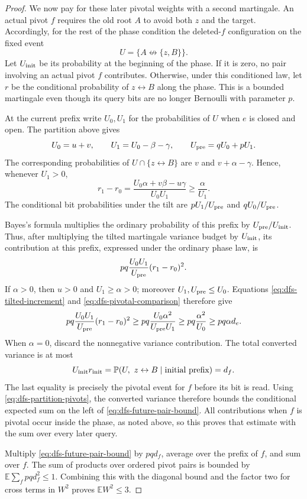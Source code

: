 \documentclass[11pt]{article}
\theoremstyle{definition}
\newcommand{\PP}{\mathbb P}
\newcommand{\EE}{\mathbb E}
\begin{document}
\begin{proof}
We now pay for these later pivotal weights with a second martingale.
An actual pivot $f$ requires the old root $A$ to avoid both $z$ and the
target. Accordingly, for the rest of the phase condition the deleted-$f$
configuration on the fixed event
\[
 U=\{A\not\leftrightarrow\{z,B\}\}.
\]
Let $U_{\rm init}$ be its probability at the beginning of the phase.
If it is zero, no pair involving an actual pivot $f$ contributes.
Otherwise, under this conditioned law, let $r$ be the conditional
probability of $z\leftrightarrow B$ along the phase. This is a
bounded martingale even though its query bits are no longer Bernoulli
with parameter $p$.

At the current prefix write $U_0,U_1$ for the probabilities of $U$
when $e$ is closed and open. The partition above gives
\[
 U_0=u+v,\qquad U_1=U_0-\beta-\gamma,
 \qquad U_{\rm pre}=qU_0+pU_1.
\]
The corresponding probabilities of $U\cap\{z\leftrightarrow B\}$
are $v$ and $v+\alpha-\gamma$. Hence, whenever $U_1>0$,
\begin{equation}\label{eq:dfs-tilted-increment}
 r_1-r_0
 =\frac{U_0\alpha+v\beta-u\gamma}{U_0U_1}
 \ge\frac\alpha{U_1}.
\end{equation}
The conditional bit probabilities under the tilt are
$pU_1/U_{\rm pre}$ and $qU_0/U_{\rm pre}$.

Bayes's formula multiplies the ordinary probability of this prefix by
$U_{\rm pre}/U_{\rm init}$. Thus, after multiplying the tilted
martingale variance budget by $U_{\rm init}$, its contribution at
this prefix, expressed under the ordinary phase law, is
\[
 pq\frac{U_0U_1}{U_{\rm pre}}(r_1-r_0)^2.
\]
If $\alpha>0$, then $u>0$ and $U_1\ge\alpha>0$; moreover
$U_1,U_{\rm pre}\le U_0$. Equations
\eqref{eq:dfs-tilted-increment} and
\eqref{eq:dfs-pivotal-comparison} therefore give
\begin{equation}\label{eq:dfs-converted-budget}
 pq\frac{U_0U_1}{U_{\rm pre}}(r_1-r_0)^2
 \ge pq\frac{U_0\alpha^2}{U_{\rm pre}U_1}
 \ge pq\frac{\alpha^2}{U_0}
 \ge pq\alpha d_e.
\end{equation}
When $\alpha=0$, discard the nonnegative variance contribution.
The total converted variance is at most
\[
 U_{\rm init}r_{\rm init}
 =\PP(U,\ z\leftrightarrow B\mid\text{initial prefix})=d_f.
\]
The last equality is precisely the pivotal event for $f$ before its
bit is read. Using \eqref{eq:dfs-partition-pivots}, the converted variance therefore
bounds the conditional expected sum on the left of
\eqref{eq:dfs-future-pair-bound}. All contributions when $f$ is pivotal
occur inside the phase, as noted above, so this proves that estimate
with the sum over every later query.

Multiply \eqref{eq:dfs-future-pair-bound} by $pq d_f$, average over
the prefix of $f$, and sum over $f$. The sum of products over ordered
pivot pairs is bounded by
$\EE\sum_f pq d_f^2\le1$. Combining this with the diagonal bound
and the factor two for cross terms in $W^2$ proves $\EE W^2\le3$.
\end{proof}
\end{document}
